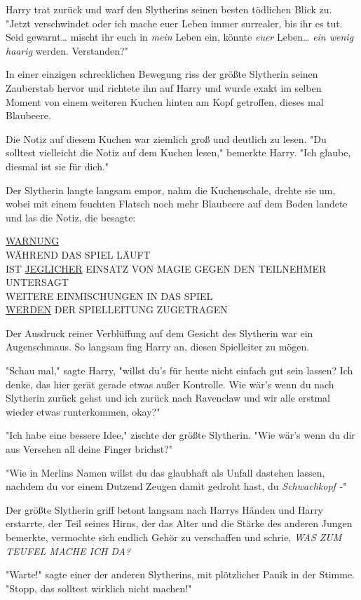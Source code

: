 {Harry trat zurück und warf den Slytherins seinen besten tödlichen Blick zu. "Jetzt verschwindet oder ich mache euer Leben immer surrealer, bis ihr es tut. Seid gewarnt… mischt ihr euch in \emph{mein} Leben ein, könnte \emph{euer} Leben… \emph{ein wenig haarig} werden. Verstanden?"

In einer einzigen schrecklichen Bewegung riss der größte Slytherin seinen Zauberstab hervor und richtete ihn auf Harry und wurde exakt im selben Moment von einem weiteren Kuchen hinten am Kopf getroffen, dieses mal Blaubeere.

Die Notiz auf diesem Kuchen war ziemlich groß und deutlich zu lesen. "Du solltest vielleicht die Notiz auf dem Kuchen lesen," bemerkte Harry. "Ich glaube, diesmal ist sie für dich."

Der Slytherin langte langsam empor, nahm die Kuchenschale, drehte sie um, wobei mit einem feuchten Flatsch noch mehr Blaubeere auf dem Boden landete und las die Notiz, die besagte:

\uline{WARNUNG}\\ WÄHREND DAS SPIEL LÄUFT\\ IST \uline{JEGLICHER} EINSATZ VON MAGIE GEGEN DEN TEILNEHMER UNTERSAGT\\ WEITERE EINMISCHUNGEN IN DAS SPIEL\\ \uline{WERDEN} DER SPIELLEITUNG ZUGETRAGEN

Der Ausdruck reiner Verblüffung auf dem Gesicht des Slytherin war ein Augenschmaus. So langsam fing Harry an, diesen Spielleiter zu mögen.

"Schau mal," sagte Harry, "willst du's für heute nicht einfach gut sein lassen? Ich denke, das hier gerät gerade etwas außer Kontrolle. Wie wär's wenn du nach Slytherin zurück gehst und ich zurück nach Ravenclaw und wir alle erstmal wieder etwas runterkommen, okay?"

"Ich habe eine bessere Idee," zischte der größte Slytherin. "Wie wär's wenn du dir aus Versehen all deine Finger brichst?"

"Wie in Merlins Namen willst du das glaubhaft als Unfall dastehen lassen, nachdem du vor einem Dutzend Zeugen damit gedroht hast, du \emph{Schwachkopf -}"

Der größte Slytherin griff betont langsam nach Harrys Händen und Harry erstarrte, der Teil seines Hirns, der das Alter und die Stärke des anderen Jungen bemerkte, vermochte sich endlich Gehör zu verschaffen und schrie, \emph{WAS ZUM TEUFEL MACHE ICH DA?}

"Warte!" sagte einer der anderen Slytherins, mit plötzlicher Panik in der Stimme. "Stopp, das solltest wirklich nicht machen!"

}
